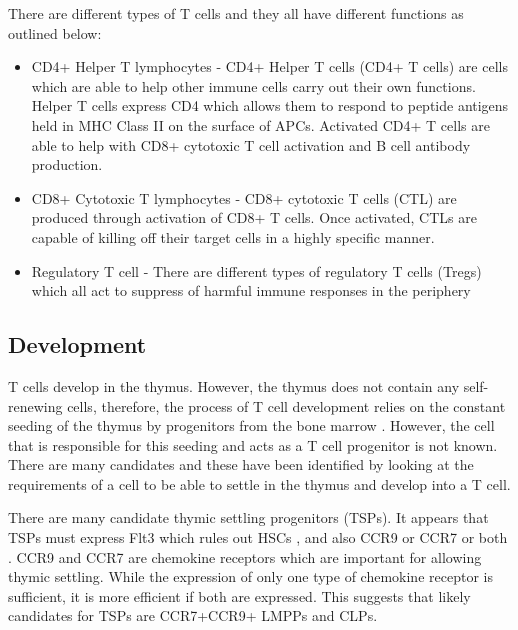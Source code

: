 There are different types of T cells and they all have different functions as outlined below:


\begin{itemize}
\item CD4+ Helper T lymphocytes - CD4+ Helper T cells (CD4+ T cells) are cells which are able to help other immune cells carry out their own functions. 
Helper T cells express CD4 which allows them to respond to peptide antigens held in MHC Class II on the surface of APCs. 
Activated CD4+ T cells are able to help with CD8+ cytotoxic T cell activation and B cell antibody production.
\item CD8+ Cytotoxic T lymphocytes - CD8+ cytotoxic T cells (CTL) are produced through activation of CD8+ T cells.
Once activated, CTLs are capable of killing off their target cells in a highly specific manner.
\item Regulatory T cell - There are different types of regulatory T cells (Tregs) which all act to suppress of harmful immune responses in the periphery
\end{itemize}


\subsection{Development}

T cells develop in the thymus.
However, the thymus does not contain any self-renewing cells, therefore, the process of T cell development relies on the constant seeding of the thymus by progenitors from the bone marrow \citep{Zlotoff2011, Heinzel2007}.
However, the cell that is responsible for this seeding and acts as a T cell progenitor is not known.
There are many candidates and these have been identified by looking at the requirements of a cell to be able to settle in the thymus and develop into a T cell.

There are many candidate thymic settling progenitors (TSPs).
It appears that TSPs must express Flt3 which rules out HSCs \citep{Zlotoff2011}, and also CCR9 or CCR7 or both \citep{Zlotoff2010}.
CCR9 and CCR7 are chemokine receptors which are important for allowing thymic settling. 
While the expression of only one type of chemokine receptor is sufficient, it is more efficient if both are expressed.
This suggests that likely candidates for TSPs are CCR7+CCR9+ LMPPs and CLPs\citep{Zlotoff2011}.


